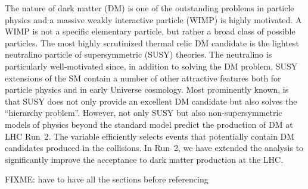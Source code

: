 The nature of dark matter (DM) is one of the outstanding problems in
particle physics and a massive weakly interactive particle (WIMP) is
highly motivated. A WIMP is not a specific elementary particle, but
rather a broad class of possible particles. The most highly
scrutinized thermal relic DM candidate is the lightest neutralino
particle of supersymmetric (SUSY) theories. The neutralino is
particularly well-motivated since, in addition to solving the DM
problem, SUSY extensions of the SM contain a number of other
attractive features both for particle physics and in early Universe
cosmology. Most prominently known, is that SUSY does not only provide
an excellent DM candidate but also solves the ``hierarchy problem''.
However, not only SUSY but also non-supersymmetric models of physics
beyond the standard model predict the production of DM at LHC Run~2.
The \alphat variable efficiently selects events that potentially
contain DM candidates produced in the collisions. In Run~2, we have extended
the \alphat analysis to significantly improve the acceptance to dark
matter production at the LHC. 

FIXME: have to have all the sections before referencing

